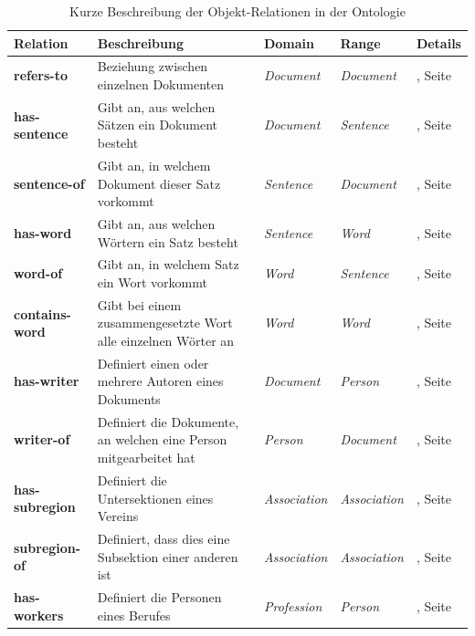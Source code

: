 \documentclass[
    11pt,
    latin1,
    a4paper,
    oneside
]{scrreprt}
\let\oldemph=\emph
\renewcommand{\emph}[1]{\index{#1}\oldemph{#1}}
\begin{document}
\begin{table}[H]
  \centering
  \begin{tabular}{ | l | p{4cm} | p{3cm} | p{2cm} | p{2cm} | }
    \hline
    \textbf{Relation} & \textbf{Beschreibung} & \textbf{Domain} & \textbf{Range} & \textbf{Details} \\ \hline
    \textbf{refers-to} & Beziehung zwischen einzelnen Dokumenten & \emph{Document} & \emph{Document} & \nameref{sec:rel_refersto}, Seite \pageref{sec:rel_refersto} \\ \hline
    \textbf{has-sentence} & Gibt an, aus welchen S\"atzen ein Dokument besteht & \emph{Document} & \emph{Sentence} & \nameref{sec:rel_hassentence}, Seite \pageref{sec:rel_hassentence} \\ \hline
    \textbf{sentence-of} & Gibt an, in welchem Dokument dieser Satz vorkommt & \emph{Sentence} & \emph{Document} & \nameref{sec:rel_sentenceof}, Seite \pageref{sec:rel_sentenceof} \\ \hline
    \textbf{has-word} & Gibt an, aus welchen W\"ortern ein Satz besteht & \emph{Sentence} & \emph{Word} & \nameref{sec:rel_hasword}, Seite \pageref{sec:rel_hasword} \\ \hline
    \textbf{word-of} & Gibt an, in welchem Satz ein Wort vorkommt & \emph{Word} & \emph{Sentence} & \nameref{sec:rel_wordof}, Seite \pageref{sec:rel_wordof} \\ \hline
    \textbf{contains-word} & Gibt bei einem zusammengesetzte Wort alle einzelnen W\"orter an & \emph{Word} & \emph{Word} & \nameref{sec:rel_containsword}, Seite \pageref{sec:rel_containsword} \\ \hline
    \textbf{has-writer} & Definiert einen oder mehrere Autoren eines Dokuments & \emph{Document} & \emph{Person} & \nameref{sec:rel_haswriter}, Seite \pageref{sec:rel_haswriter} \\ \hline
    \textbf{writer-of} & Definiert die Dokumente, an welchen eine Person mitgearbeitet hat & \emph{Person} & \emph{Document} & \nameref{sec:rel_writerof}, Seite \pageref{sec:rel_writerof} \\ \hline
    \textbf{has-subregion} & Definiert die Untersektionen eines Vereins & \emph{Association} & \emph{Association} & \nameref{sec:rel_hassubregion}, Seite \pageref{sec:rel_hassubregion} \\ \hline
    \textbf{subregion-of} & Definiert, dass dies eine Subsektion einer anderen ist & \emph{Association} & \emph{Association} & \nameref{sec:rel_subregionof}, Seite \pageref{sec:rel_subregionof} \\ \hline
    \textbf{has-workers} & Definiert die Personen eines Berufes & \emph{Profession} & \emph{Person} & \nameref{sec:rel_hasworkers}, Seite \pageref{sec:rel_hasworkers} \\ \hline
  \end{tabular}
  \caption{Kurze Beschreibung der Objekt-Relationen in der Ontologie}
  \label{tbl:relations}
\end{table}
\end{document}
